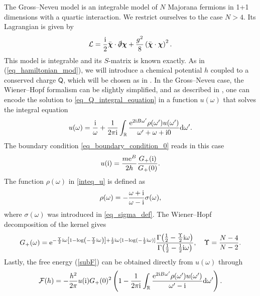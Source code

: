 \documentclass[a4paper,11pt]{article}
\theoremstyle{definition}
\newcommand{\CF}{{\cal F}}
\newcommand{\CL}{{\cal L}}
\def\IR{{\mathbb R}}
\newcommand{\re}{{\rm e}}
\newcommand{\ri}{{\rm i}}
\newcommand{\rd}{{\rm d}}
\begin{document}
The Gross--Neveu model is an integrable model of $N$ Majorana fermions in 1+1 dimensions with a quartic interaction. 
We restrict ourselves to the case $N>4$. Its Lagrangian is given by 
%
\begin{equation}
\CL = \frac{\ri}{2}\bar{\boldsymbol{\chi}}\cdot\slashed{\partial}\boldsymbol{\chi}+\frac{g^2}{8}\left(\bar{\boldsymbol{\chi}}\cdot\boldsymbol{\chi}\right)^2.
\end{equation}
%
This model is integrable and its $S$-matrix is known exactly. As in (\ref{eq_hamiltonian_mod}), we 
will introduce a chemical potential $h$ coupled to a conserved charge $\mathsf{Q}$, which will be 
chosen as in \cite{fnw1,fnw2}. In the Gross--Neveu case, the Wiener--Hopf formalism can be 
slightly simplified, and as described in \cite{fnw1,mmr-an}, one can encode the solution to \eqref{eq_Q_integral_equation} in a function $u(\omega)$ 
that solves the integral equation
%
\begin{equation}
u(\omega) = \frac{\ri}{\omega}+ \frac{1}{2\pi\ri}\int_\IR \frac{\re^{2\ri B \omega'}\rho(\omega')u(\omega') }{\omega'+\omega+\ri 0} \rd \omega'.
\label{inteq_u}
\end{equation}
%
The boundary condition \eqref{eq_boundary_condition_0} reads in this case
%
\begin{equation}
u(\ri) = \frac{m \re^B}{2h} \frac{G_+(\ri)}{G_+(0)}.
\label{u_bc}
\end{equation}
%
The 
function $\rho(\omega)$ in \eqref{inteq_u} is defined as
%
\begin{equation}
\rho(\omega) = - \frac{\omega+\ri}{\omega-\ri}\sigma(\omega),
\label{rhofunc_def}
\end{equation}
%
where $\sigma(\omega)$ was introduced in \eqref{eq_sigma_def}. The Wiener--Hopf decomposition of the kernel gives
%
\begin{equation}
G_+(\omega)=\re^{-\frac{\Upsilon}{2}\ri\omega\left[1-\log\left(-\frac{\Upsilon}{2}\ri\omega\right)\right]+\frac{1}{2}\ri\omega[1-\log(-\frac{1}{2}\ri\omega)]} \frac{\Gamma\big(\frac{1}{2} - \frac{\Upsilon}{2}\ri\omega\big)}{\Gamma\big(\frac{1}{2} - \frac{1}{2}\ri\omega\big)},\quad \Upsilon = \frac{N-4}{N-2}.
\label{GN_Gplus_usec}
\end{equation} 
Lastly, the free energy (\ref{subF}) can be obtained directly from  $u(\omega)$ through
\begin{equation}
\CF(h) = - \frac{h^2}{2\pi}u(\ri)G_+(0)^2\left(1- \frac{1}{2\pi\ri}\int_\IR \frac{\re^{2\ri B \omega'}\rho(\omega')u(\omega') }{\omega'-\ri} \rd \omega'\right).
\label{fh-u}
\end{equation}
\end{document}

